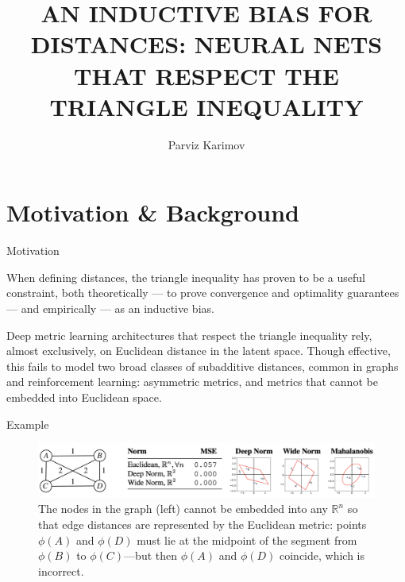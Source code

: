 \documentclass{beamer}
\title{AN INDUCTIVE BIAS FOR DISTANCES: NEURAL NETS
THAT RESPECT THE TRIANGLE INEQUALITY}
\author{Parviz Karimov}
\institute{MIPT, 2024}
\begin{document}
\begin{frame}
    \titlepage
\end{frame}


\begin{frame}
    \tableofcontents
\end{frame}


\section{Motivation \& Background}

\begin{frame}{Motivation}
    \begin{block}{}
    When defining distances, the triangle inequality has proven to be a useful constraint, both theoretically — to prove convergence and optimality guarantees — and empirically — as an inductive bias.
    \newline

    Deep metric learning architectures that
respect the triangle inequality rely, almost exclusively, on Euclidean distance in the
latent space. Though effective, this fails to model two broad classes of subadditive
distances, common in graphs and reinforcement learning: asymmetric metrics, and
metrics that cannot be embedded into Euclidean space.
    \end{block} 
\end{frame}

\begin{frame}{Example}
    \begin{figure}
        \centering
        \includegraphics[width=\linewidth]{5.png}
        \caption{The nodes in the graph (left) cannot be embedded into any $\mathbb{R}^n$ so that edge distances are represented by the Euclidean metric: points $\phi(A)$ and $\phi(D)$ must lie at the midpoint of the segment
from $\phi(B)$ to $\phi(C)$—but then $\phi(A)$ and $\phi(D)$ coincide, which is incorrect. }
        \label{fig:enter-label}
    \end{figure}
\end{frame}
\end{document}
